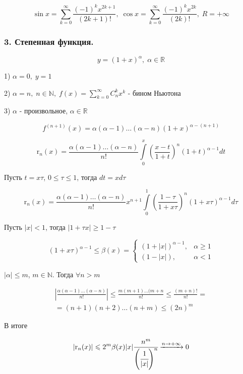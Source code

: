 \documentclass[a4paper,12pt]{article} %
\newcommand{\ryad}{\sum\limits^{\infty}_{k = 0}}
\renewcommand {\geq}{\geqslant}
\begin{document}
$$ 
\sin x = \ryad \frac{(-1)^k x^{2k + 1}}{(2k + 1)!}, \; \cos x = \ryad \frac{(-1)^k x^{2k}}{(2k)!}, \;R = + \infty
$$


\subsubsection*{3. Степенная функция.}

$$y = (1 + x)^{\alpha}, \; \alpha \in \mathbb{R}$$


1) $\alpha = 0, \; y = 1$

2) $\alpha = n, \; n \in \mathbb{N}, \; f(x) = \ryad C^k_n x^k$ - бином Ньютона

3) $\alpha$ - произвольное, $\alpha \in \mathbb{R}$

$$ 
	f^{(n + 1)}(x) = \alpha (\alpha - 1) \ldots (\alpha - n) (1 + x)^{\alpha - (n + 1)} $$

$$
\mathrm{r}_n(x) = \frac{\alpha(\alpha - 1) \ldots (\alpha - n)}{n!} \int\limits_0^x \left(\frac{x - t}{1 + t} \right)^n (1 + t)^{\alpha - 1} dt
$$

Пусть $t = x \tau$, $0 \leqslant \tau \leqslant 1$, тогда $dt = x d \tau$

$$
\mathrm{r}_n(x) =  \frac{\alpha(\alpha - 1) \ldots (\alpha - n)}{n!} x^{n + 1} \int\limits_0^1 \left( \frac{1 - \tau}{1 + x\tau} \right)^n ( 1 + x \tau)^{\alpha - 1} d \tau
$$

Пусть $|x| < 1$, тогда $|1 + \tau x| \geqslant 1 - \tau$



\begin{equation*}
(1+x \tau)^{\alpha-1} \leqslant \beta(x)=
 \begin{cases}
   (1+|x|)^{\alpha-1}, & \alpha \geq 1 \\
   (1-|x|), & \alpha<1
 \end{cases}
\end{equation*}

$ | \alpha | \leqslant m $, $m \in \mathbb{N}$. Тогда $\forall n > m$

\begin{multline*}
\left| \frac{\alpha(\alpha - 1) \ldots (\alpha - n)}{n!} \right| \leqslant \frac{m (m + 1) \ldots (m + n}{n!} \leqslant \frac{(m + n)!}{n!} = \\
= (n + 1)(n + 2) \ldots (n + m)\leqslant (2n)^m
\end{multline*}

В итоге

$$ 
\left| \mathrm{r}_n (x) \right| \leqslant 2^m \beta (x) |x| \cfrac{n^m}{\left(\cfrac{1}{|x|}\right)^n} \xrightarrow{n \rightarrow + \infty} 0
$$
\end{document}
